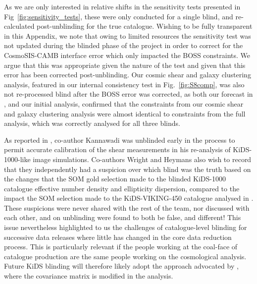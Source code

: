 \begin{appendix}
As we are only interested in relative shifts in the sensitivity tests presented in Fig~\ref{fig:sensitivity_tests}, these were only conducted for a single blind, and re-calculated post-unblinding for the true catalogue.  Wishing to be fully transparent in this Appendix, we note that owing to limited resources the sensitivity test was not updated during the blinded phase of the project in order to correct for the {\sc CosmoSIS-CAMB} interface error which only impacted the BOSS constraints.   We argue that this was appropriate given the nature of the test and given that this error has been corrected post-unblinding.    Our cosmic shear and galaxy clustering analysis, featured in our internal consistency test in Fig.~\ref{fig:S8comp}, was also not re-processed blind after the BOSS error was corrected, as both our forecast in \citet{joachimi/etal:inprep}, and our initial analysis, confirmed that the constraints from our cosmic shear and galaxy clustering analysis were almost identical to constraints from the full \tttp analysis, which was correctly analysed for all three blinds.

As reported in \citet{giblin/etal:inprep}, co-author Kannawadi was unblinded early in the process to permit accurate calibration of the shear measurements in his re-analysis of KiDS-1000-like image simulations.   Co-authors Wright and Heymans also wish to record that they independently had a suspicion over which blind was the truth based on the changes that the SOM gold selection made to the blinded KiDS-1000 catalogue effective number density and ellipticity dispersion, compared to the impact the SOM selection made to the KiDS-VIKING-450 catalogue analysed in \citet{wright/etal:2020b}.  These suspicions were never shared with the rest of the team, nor discussed with each other, and on unblinding were found to both be false, and different!   This issue nevertheless highlighted to us the challenges of catalogue-level blinding for successive data releases where little has changed in the core data reduction process.  This is particularly relevant if the people working at the coal-face of catalogue production are the same people working on the cosmological analysis.   Future KiDS blinding will therefore likely adopt the approach advocated by \citet{sellentin:2020}, where the covariance matrix is modified in the analysis.


\end{appendix}